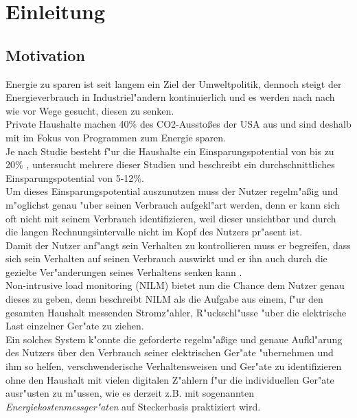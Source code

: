 \section{Einleitung}
\label{Einleitung}

\subsection{Motivation}
\label{Motivation}
	Energie zu sparen ist seit langem ein Ziel der Umweltpolitik, dennoch steigt der Energieverbrauch in Industriel"andern kontinuierlich und es werden nach nach wie vor Wege gesucht, diesen zu senken. \\
	Private Haushalte machen 40\% des CO2-Aussto{\ss}es \cite{vandenbergh2008individual} der USA aus und sind deshalb mit im Fokus von Programmen zum Energie sparen. \\
	Je nach Studie besteht f"ur die Haushalte ein Einsparungspotential von bis zu 20\% \cite{armel2013disaggregation}, \cite{fischer2008feedback} untersucht mehrere dieser Studien und beschreibt ein durchschnittliches Einsparungspotential von 5-12\%.\\
	Um dieses Einsparungspotential auszunutzen muss der Nutzer regelm"a{\ss}ig und m"oglichst genau "uber seinen Verbrauch aufgekl"art werden, 	%
	denn er kann sich oft nicht mit seinem Verbrauch identifizieren, weil dieser unsichtbar und durch die langen Rechnungsintervalle nicht im Kopf des Nutzers pr"asent ist. \\
	Damit der Nutzer anf"angt sein Verhalten zu kontrollieren muss er begreifen, dass sich sein Verhalten auf seinen Verbrauch auswirkt und er ihn auch durch die gezielte Ver"anderungen seines Verhaltens senken kann \cite{fischer2008feedback}.\\
	Non-intrusive load monitoring (NILM) bietet nun die Chance dem Nutzer genau dieses zu geben, denn \cite{kolter2011redd} beschreibt NILM als die Aufgabe aus einem, f"ur den gesamten Haushalt messenden Stromz"ahler, R"uckschl"usse "uber die elektrische Last einzelner Ger"ate zu ziehen. \\
	Ein solches System k"onnte die geforderte regelm"a{\ss}ige und genaue Aufkl"arung des Nutzers über den Verbrauch seiner elektrischen Ger"ate "ubernehmen und ihm so helfen, verschwenderische Verhaltensweisen und Ger"ate zu identifizieren ohne den Haushalt mit vielen digitalen Z"ahlern f"ur die individuellen Ger"ate ausr"usten zu m"ussen, wie es derzeit z.B. mit sogenannten \textit{Energiekostenmessger"aten} auf Steckerbasis praktiziert wird.


